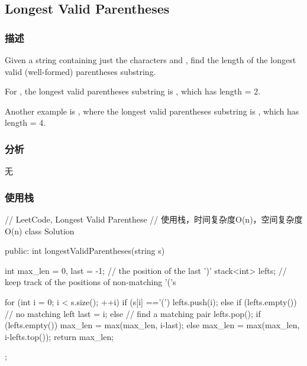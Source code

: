 \subsection{Longest Valid Parentheses} %
\label{sec:longest-valid-parentheses}


\subsubsection{描述}
Given a string containing just the characters  and , find the length of the longest valid (well-formed) parentheses substring.

For , the longest valid parentheses substring is , which has length = 2.

Another example is , where the longest valid parentheses substring is , which has length = 4.


\subsubsection{分析}
无


\subsubsection{使用栈}
\begin{Code}
// LeetCode, Longest Valid Parenthese
// 使用栈，时间复杂度O(n)，空间复杂度O(n)
class Solution {
public:
    int longestValidParentheses(string s) {
        int max_len = 0, last = -1; // the position of the last ')'
        stack<int> lefts;  // keep track of the positions of non-matching '('s

        for (int i = 0; i < s.size(); ++i) {
            if (s[i] =='(') {
                lefts.push(i);
            } else {
                if (lefts.empty()) {
                    // no matching left
                    last = i;
                } else {
                    // find a matching pair
                    lefts.pop();
                    if (lefts.empty()) {
                        max_len = max(max_len, i-last);
                    } else {
                        max_len = max(max_len, i-lefts.top());
                    }
                }
            }
        }
        return max_len;
    }
};
\end{Code}


